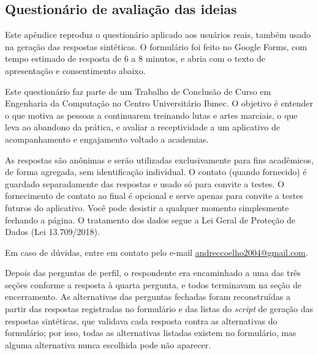 \begin{apendicesenv}
\partapendices
{}

\chapter{Questionário de avaliação das ideias}
\label{ap:questionario}

Este apêndice reproduz o questionário aplicado aos usuários reais, também
usado na geração das respostas sintéticas. O formulário foi feito no
Google Forms, com tempo estimado de resposta de 6 a 8 minutos, e abria com
o texto de apresentação e consentimento abaixo.

\begin{citacao}
Este questionário faz parte de um Trabalho de Conclusão de Curso em
Engenharia da Computação no Centro Universitário Ibmec. O objetivo é
entender o que motiva as pessoas a continuarem treinando lutas e artes
marciais, o que leva ao abandono da prática, e avaliar a receptividade a
um aplicativo de acompanhamento e engajamento voltado a academias.

As respostas são anônimas e serão utilizadas exclusivamente para fins
acadêmicos, de forma agregada, sem identificação individual. O contato
(quando fornecido) é guardado separadamente das respostas e usado só para
convite a testes. O fornecimento de contato ao final é opcional e serve
apenas para convite a testes futuros do aplicativo. Você pode desistir a
qualquer momento simplesmente fechando a página. O tratamento dos dados
segue a Lei Geral de Proteção de Dados (Lei 13.709/2018).

Em caso de dúvidas, entre em contato pelo e-mail
\url{andreccoelho2004@gmail.com}.
\end{citacao}

Depois das perguntas de perfil, o respondente era encaminhado a uma das
três seções conforme a resposta à quarta pergunta, e todos terminavam na
seção de encerramento. As alternativas das perguntas fechadas foram
reconstruídas a partir das respostas registradas no formulário e das
listas do \textit{script} de geração das respostas sintéticas, que
validava cada resposta contra as alternativas do formulário; por isso,
todas as alternativas listadas existem no formulário, mas alguma
alternativa nunca escolhida pode não aparecer.


\end{apendicesenv}
